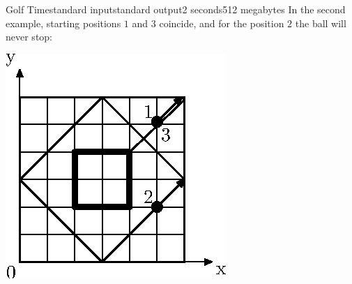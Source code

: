 \begin{problem}{Golf Time}{standard input}{standard output}{2 seconds}{512 megabytes}
In the second example, starting positions $1$ and $3$ coincide, and for
the position $2$ the ball will never stop:

\begin{center}
\includegraphics{a-2}
\end{center}

\end{problem}


